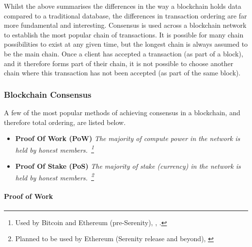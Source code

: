 Whilst the above summarises the differences in the way a blockchain holds data compared to a traditional database, the differences in transaction ordering are far more fundamental and interesting. Consensus is used across a blockchain network to establish the most popular chain of transactions. It is possible for many chain possibilities to exist at any given time, but the longest chain is always assumed to be the main chain. Once a client has accepted a transaction (as part of a block), and it therefore forms part of their chain, it is not possible to choose another chain where this transaction has not been accepted (as part of the same block).

\subsubsection{Blockchain Consensus}

A few of the most popular methods of achieving consensus in a blockchain, and therefore total ordering, are listed below.

\begin{itemize}
  \item
    \textbf{Proof Of Work (PoW)}
    \textit{The majority of compute power in the network is held by honest members.~\footnote{Used by Bitcoin and Ethereum (pre-Serenity), \cite{bitcoinwiki:2017:online}, \cite{cryptocompare:2017:online}.}}
  \item
    \textbf{Proof Of Stake (PoS)}
    \textit{The majority of stake (currency) in the network is held by honest members.~\footnote{Planned to be used by Ethereum (Serenity release and beyond), \cite{cryptocompare:2017:online}}}
\end{itemize}

\paragraph{Proof of Work}


